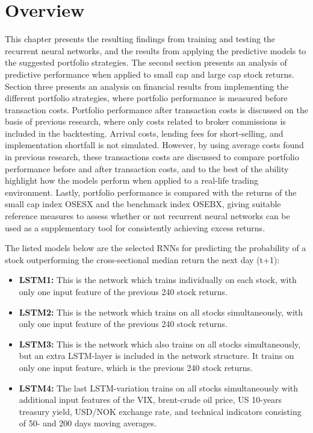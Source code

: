 \section{Overview}
This chapter presents the resulting findings from training and testing the recurrent neural networks, and the results from applying the predictive models to the suggested portfolio strategies. The second section presents an analysis of predictive performance when applied to small cap and large cap stock returns. Section three presents an analysis on financial results from implementing the different portfolio strategies, where portfolio performance is measured before transaction costs. Portfolio performance after transaction costs is discussed on the basis of previous research, where only costs related to broker commissions is included in the backtesting. Arrival costs, lending fees for short-selling, and implementation shortfall is not simulated. However, by using average costs found in previous research, these transactions costs are discussed to compare portfolio performance before and after transaction costs, and to the best of the ability highlight how the models perform when applied to a real-life trading environment. Lastly, portfolio performance is compared with the returns of the small cap index OSESX and the benchmark index OSEBX, giving suitable reference measures to assess whether or not recurrent neural networks can be used as a supplementary tool for consistently achieving excess returns. 

\indent\newline
The listed models below are the selected RNNs for predicting the probability of a stock outperforming the cross-sectional median return the next day (t+1):

\indent \newline
\begin{itemize}
\item {\textbf{LSTM1:} This is the network which trains individually on each stock, with only one input feature of the previous 240 stock returns.} 
\item {\textbf{LSTM2:} This is the network which trains on all stocks simultaneously, with only one input feature of the previous 240 stock returns.}  
\item {\textbf{LSTM3:} This is the network which also trains on all stocks simultaneously, but an extra LSTM-layer is included in the network structure. It trains on only one input feature, which is the previous 240 stock returns.}
\item {\textbf{LSTM4:} The last LSTM-variation trains on all stocks simultaneously with additional input features of the VIX, brent-crude oil price, US 10-years treasury yield, USD/NOK exchange rate, and technical indicators consisting of 50- and 200 days moving averages.}
\end{itemize}    

